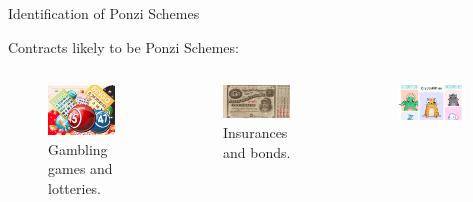 \documentclass[aspectratio=169,10pt]{beamer}
\begin{document}
\begin{frame}{Identification of Ponzi Schemes}

Contracts likely to be Ponzi Schemes: \bigskip

\begin{columns}
\begin{column}{0.32\textwidth}
\begin{figure}
    \centering
    \includegraphics[width=0.9\textwidth]{images/lottery.jpg}
    \caption{Gambling games and lotteries.}
    \label{fig:ponzi-1}
\end{figure}
\end{column}
\begin{column}{0.32\textwidth}
\begin{figure}
    \centering
    \includegraphics[width=0.9\textwidth]{images/bonds.jpeg}
    \caption{Insurances and bonds.}
    \label{fig:ponzi-2}
\end{figure}
\end{column}
\begin{column}{0.32\textwidth}
\begin{figure}
    \centering
    \includegraphics[width=0.9\textwidth]{images/cryptokitties.png}

\end{figure}
\end{column}
\end{columns}
\end{frame}
\end{document}
